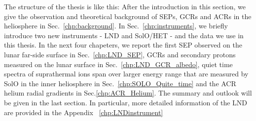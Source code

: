 The structure of the thesis is like this: After the introduction in this section, we give the observation and theoretical background of \acp{SEP}, \acp{GCR} and \acp{ACR} in the heliosphere in Sec.~\ref{chp:background}. In Sec.~\ref{chp:instruments}, we briefly introduce two new instruments - \ac{LND} and \ac{SolO}/\ac{HET} - and the data we use in this thesis. In the next four chapeters, we report the first \ac{SEP} observed on the lunar far-side surface in Sec.~\ref{chp:LND_SEP}, \acp{GCR} and secondary protons measured on the lunar surface in Sec.~\ref{chp:LND_GCR_albedo}, quiet time spectra of suprathermal ions span over larger energy range that are measured by \ac{SolO} in the inner heliosphere in Sec.~\ref{chp:SOLO_Quite_time} and the \ac{ACR} helium radial gradients in Sec.\ref{chp:ACR_Helium}. The summary and outlook will be given in the last section.
In particular, more detailed information of the \ac{LND} are provided in the Appendix ~\ref{chp:LNDinstrument}
















 

